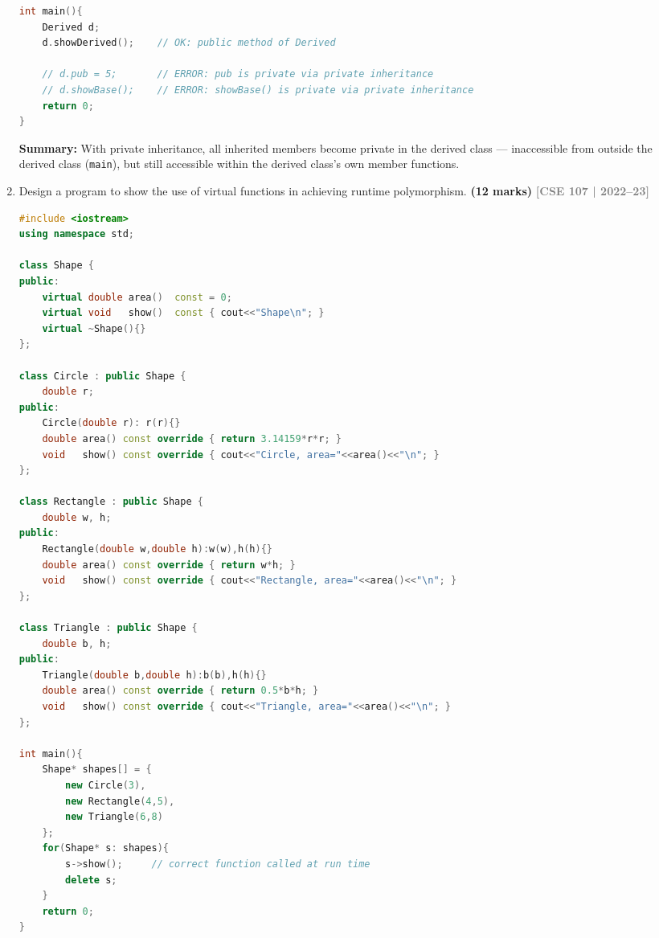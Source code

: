 \documentclass[12pt,a3paper]{article}
\newcommand{\yr}[1]{\hfill\textcolor{gray}{\small\textbf{[#1]}}}
\newcommand{\mk}[1]{\textcolor{orange!70!black}{\small\textbf{(#1 marks)}}}
\begin{document}
\begin{enumerate}
\begin{tcolorbox}
\begin{lstlisting}[language=C++]
int main(){
    Derived d;
    d.showDerived();    // OK: public method of Derived

    // d.pub = 5;       // ERROR: pub is private via private inheritance
    // d.showBase();    // ERROR: showBase() is private via private inheritance
    return 0;
}
\end{lstlisting}

\textbf{Summary:} With private inheritance, all inherited members
become private in the derived class --- inaccessible from outside the
derived class (\texttt{main}), but still accessible within the
derived class's own member functions.

\end{tcolorbox}


\item Design a program to show the use of virtual functions in achieving runtime polymorphism. \mk{12}
\yr{CSE 107 | 2022--23}

\begin{tcolorbox}[enhanced,breakable,ansbox,colback=cG!4,colframe=cG,
  boxrule=0.8pt,arc=5pt,
  title={\textbf{Answer --- Runtime polymorphism with virtual functions}},
  fonttitle=\bfseries\color{white},colbacktitle=cG]

\begin{lstlisting}[language=C++]
#include <iostream>
using namespace std;

class Shape {
public:
    virtual double area()  const = 0;
    virtual void   show()  const { cout<<"Shape\n"; }
    virtual ~Shape(){}
};

class Circle : public Shape {
    double r;
public:
    Circle(double r): r(r){}
    double area() const override { return 3.14159*r*r; }
    void   show() const override { cout<<"Circle, area="<<area()<<"\n"; }
};

class Rectangle : public Shape {
    double w, h;
public:
    Rectangle(double w,double h):w(w),h(h){}
    double area() const override { return w*h; }
    void   show() const override { cout<<"Rectangle, area="<<area()<<"\n"; }
};

class Triangle : public Shape {
    double b, h;
public:
    Triangle(double b,double h):b(b),h(h){}
    double area() const override { return 0.5*b*h; }
    void   show() const override { cout<<"Triangle, area="<<area()<<"\n"; }
};

int main(){
    Shape* shapes[] = {
        new Circle(3),
        new Rectangle(4,5),
        new Triangle(6,8)
    };
    for(Shape* s: shapes){
        s->show();     // correct function called at run time
        delete s;
    }
    return 0;
}
\end{lstlisting}


\end{tcolorbox}
\end{enumerate}
\end{document}
